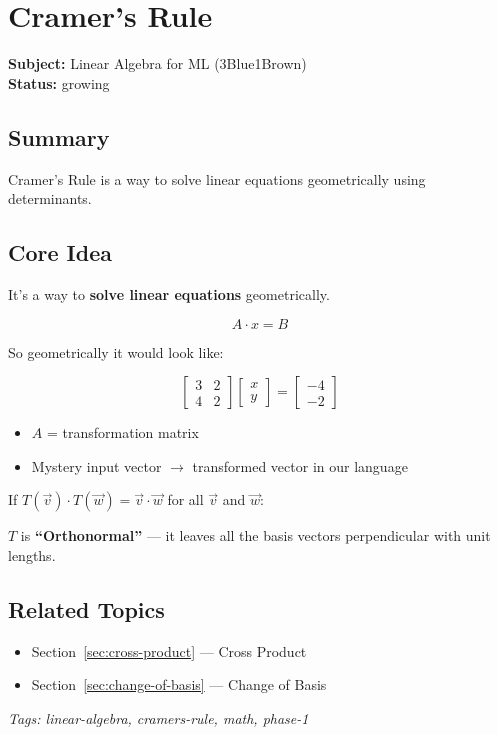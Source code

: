 \section{Cramer's Rule}
\label{sec:cramers-rule}

\noindent\textbf{Subject:} Linear Algebra for ML (3Blue1Brown) \\
\textbf{Status:} growing

\subsection*{Summary}
Cramer's Rule is a way to solve linear equations geometrically using determinants.

\subsection{Core Idea}

\begin{defbox}
It's a way to \textbf{solve linear equations} geometrically.
\end{defbox}

\[
A \cdot x = B
\]

So geometrically it would look like:

\[
\begin{bmatrix} 3 & 2 \\ 4 & 2 \end{bmatrix} \begin{bmatrix} x \\ y \end{bmatrix} = \begin{bmatrix} -4 \\ -2 \end{bmatrix}
\]

\begin{itemize}[nosep]
  \item $A$ = transformation matrix
  \item Mystery input vector $\rightarrow$ transformed vector in our language
\end{itemize}

If $T(\vec{v}) \cdot T(\vec{w}) = \vec{v} \cdot \vec{w}$ for all $\vec{v}$ and $\vec{w}$:

\begin{defbox}
$T$ is \textbf{``Orthonormal''} --- it leaves all the basis vectors perpendicular with unit lengths.
\end{defbox}

\subsection*{Related Topics}
\begin{itemize}[nosep]
  \item Section~\ref{sec:cross-product} --- Cross Product
  \item Section~\ref{sec:change-of-basis} --- Change of Basis
\end{itemize}

\bigskip
\noindent\textit{Tags: linear-algebra, cramers-rule, math, phase-1}
